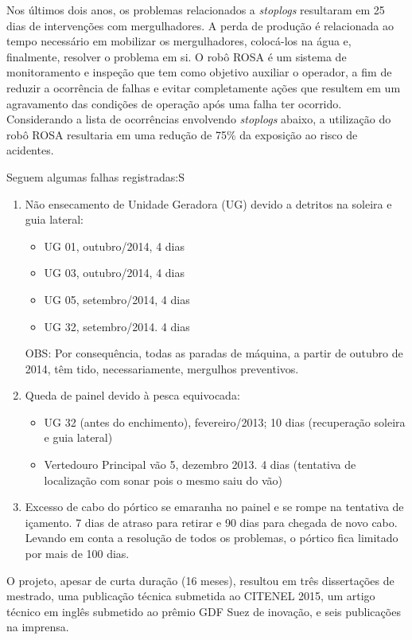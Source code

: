 Nos últimos dois anos, os problemas relacionados a \textit{stoplogs}
resultaram em 25 dias de intervenções com mergulhadores. A perda de
produção é relacionada ao tempo necessário em mobilizar os mergulhadores,
colocá-los na água e, finalmente, resolver o problema em si. O robô ROSA é um
sistema de monitoramento e inspeção que tem como objetivo auxiliar o
operador, a fim de reduzir a ocorrência de falhas e evitar completamente ações
que resultem em um agravamento das condições de operação após uma falha ter
ocorrido. Considerando a lista de ocorrências envolvendo \textit{stoplogs}
abaixo, a utilização do robô ROSA resultaria em uma redução de 75\% da
exposição ao risco de acidentes.

Seguem algumas falhas registradas:S
\begin{enumerate}
\item Não ensecamento de Unidade Geradora (UG) devido a detritos na soleira e
guia lateral:
\begin{itemize}
\item UG 01, outubro/2014, 4 dias
\item UG 03, outubro/2014, 4 dias
\item UG 05, setembro/2014, 4 dias
\item UG 32, setembro/2014. 4 dias	
\end{itemize}
OBS: Por consequência, todas as paradas de máquina, a partir de
outubro de 2014, têm tido, necessariamente, mergulhos
preventivos. 
\item Queda de painel devido à pesca equivocada:
\begin{itemize}
\item UG 32 (antes do enchimento), fevereiro/2013; 10 dias (recuperação
soleira e guia lateral)
\item Vertedouro Principal vão 5, dezembro 2013. 4 dias (tentativa de
localização com sonar pois o mesmo saiu do vão)
\end{itemize}
\item Excesso de cabo do pórtico se emaranha no painel e se rompe na
tentativa de içamento. 7 dias de atraso para retirar e 90 dias para chegada de
novo cabo. Levando em conta a resolução de todos os problemas, o pórtico fica limitado por mais de 100 dias.
\end{enumerate}

O projeto, apesar de curta duração (16 meses), resultou em três dissertações de 
mestrado, uma publicação técnica submetida ao CITENEL 2015, um artigo técnico 
em inglês submetido ao prêmio GDF Suez de inovação, e seis publicações na
imprensa.

